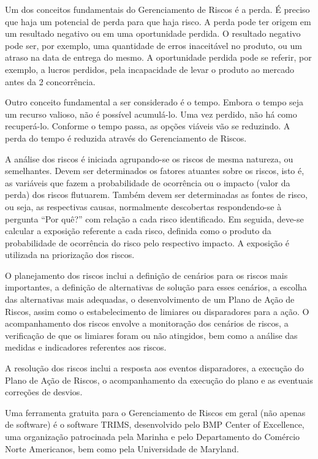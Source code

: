 \documentclass[12pt]{article}
\begin{document}
        Um dos conceitos fundamentais do Gerenciamento de Riscos é a perda. É preciso que haja um potencial de perda para que haja risco. A perda pode ter origem em um resultado negativo ou em uma oportunidade perdida. O resultado negativo pode ser, por exemplo, uma quantidade de erros inaceitável no produto, ou um atraso na data de entrega do mesmo. A oportunidade perdida pode se referir, por exemplo, a lucros perdidos, pela incapacidade de levar o produto ao mercado antes da 2 concorrência. 
        
        Outro conceito fundamental a ser considerado é o tempo. Embora o tempo seja um recurso valioso, não é possível acumulá-lo. Uma vez perdido, não há como recuperá-lo. Conforme o tempo passa, as opções viáveis vão se reduzindo. A perda do tempo é reduzida através do Gerenciamento de Riscos.

        A análise dos riscos é iniciada agrupando-se os riscos de mesma natureza, ou semelhantes. Devem ser determinados os fatores atuantes sobre os riscos, isto é, as variáveis que fazem a probabilidade de ocorrência ou o impacto (valor da perda) dos riscos flutuarem. Também devem ser determinadas as fontes de risco, ou seja, as respectivas causas, normalmente descobertas respondendo-se à pergunta “Por quê?” com relação a cada risco identificado. Em seguida, deve-se calcular a exposição referente a cada risco, definida como o produto da probabilidade de ocorrência do risco pelo respectivo impacto. A exposição é utilizada na priorização dos riscos. 

        O planejamento dos riscos inclui a definição de cenários para os riscos mais importantes, a definição de alternativas de solução para esses cenários, a escolha das alternativas mais adequadas, o desenvolvimento de um Plano de Ação de Riscos, assim como o estabelecimento de limiares ou disparadores para a ação. O acompanhamento dos riscos envolve a monitoração dos cenários de riscos, a verificação de que os limiares foram ou não atingidos, bem como a análise das medidas e indicadores referentes aos riscos. 

        A resolução dos riscos inclui a resposta aos eventos disparadores, a execução do Plano de Ação de Riscos, o acompanhamento da execução do plano e as eventuais correções de desvios.

        Uma ferramenta gratuita para o Gerenciamento de Riscos em geral (não apenas de software) é o software TRIMS, desenvolvido pelo BMP Center of Excellence, uma organização patrocinada pela Marinha e pelo Departamento do Comércio Norte Americanos, bem como pela Universidade de Maryland.
\end{document}
